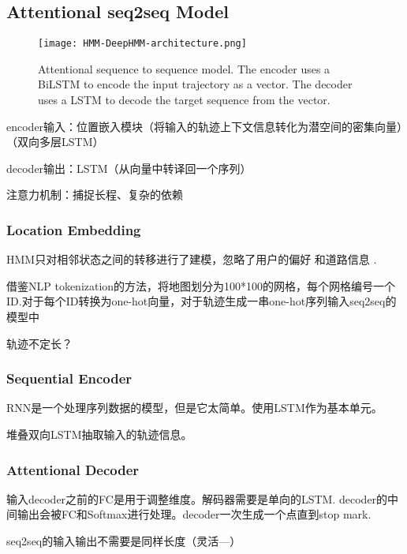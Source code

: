 \subsection{Attentional seq2seq Model}

\begin{figure}[htbp]
    \caption{Attentional sequence to sequence model. The encoder uses a
    BiLSTM to encode the input trajectory as a vector. The decoder uses a
    LSTM to decode the target sequence from the vector.}
    \centering
    \texttt{[image: HMM-DeepHMM-architecture.png]}
\end{figure}

encoder输入：位置嵌入模块（将输入的轨迹上下文信息转化为潜空间的密集向量）（双向多层LSTM）

decoder输出：LSTM（从向量中转译回一个序列）

注意力机制：捕捉长程、复杂的依赖

\subsubsection{Location Embedding}

HMM只对相邻状态之间的转移进行了建模，忽略了用户的偏好 \cite{Jagadeesh2017} 和道路信息 \cite{Hu2017a}.

借鉴NLP tokenization的方法，将地图划分为100*100的网格，每个网格编号一个ID.对于每个ID转换为one-hot向量，对于轨迹生成一串one-hot序列输入seq2seq的模型中

\begin{remark}
    轨迹不定长？
\end{remark}

\subsubsection{Sequential Encoder}

RNN是一个处理序列数据的模型，但是它太简单。使用LSTM作为基本单元。

堆叠双向LSTM抽取输入的轨迹信息。

\subsubsection{Attentional Decoder}

输入decoder之前的FC是用于调整维度。解码器需要是单向的LSTM. decoder的中间输出会被FC和Softmax进行处理。decoder一次生成一个点直到stop mark.

seq2seq的输入输出不需要是同样长度（灵活—）

